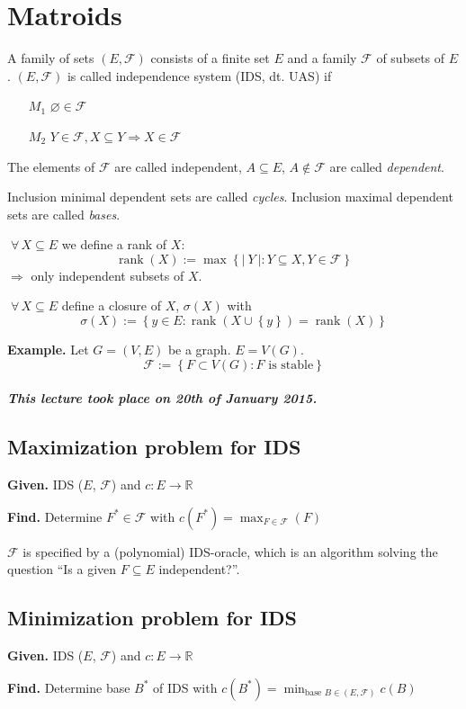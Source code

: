 \documentclass{article}
\newcommand{\card}[1]{\left|\:\!#1\:\!\right|}
\newcommand{\set}[1]{\left\{#1\right\}}
\newcommand{\given}[1]{\textbf{Given.} #1\par}
\newcommand{\find}[1]{\textbf{Find.} #1\par}
\newcommand{\dateref}[1]{\paragraph{\textit{This lecture took place on #1.}}}
\newcommand{\fall}{\;\forall\,}
\DeclareMathOperator{\rank}{rank}
\begin{document}
\section{Matroids}
%
A family of sets $(E, \mathcal{F})$ consists of a finite set $E$ and a family $\mathcal{F}$ of subsets of $E$.
$(E, \mathcal{F})$ is called independence system (IDS, dt. UAS) if
\begin{itemize}
  \item[$M_1$] $\diameter \in \mathcal{F}$
  \item[$M_2$] $Y \in \mathcal{F}, X \subseteq Y \Rightarrow X \in \mathcal{F}$
\end{itemize}

The elements of $\mathcal{F}$ are called independent, $A \subseteq E$, $A \notin \mathcal{F}$ are called \emph{dependent}.

Inclusion minimal dependent sets are called \emph{cycles}.
Inclusion maximal dependent sets are called \emph{bases}.

$\fall X \subseteq E$ we define a rank of $X$:
\[ \rank(X) := \max\set{\card{Y}: Y \subseteq X, Y \in \mathcal{F}} \]
$\Rightarrow$ only independent subsets of $X$.

$\fall X \subseteq E$ define a closure of $X$, $\sigma(X)$ with
\[ \sigma(X) := \set{y \in E: \rank(X \cup \set{y}) = \rank(X)} \]

\textbf{Example.}
  Let $G = (V, E)$ be a graph. $E = V(G)$.
  \[ \mathcal{F} := \set{F \subset V(G): F \text{ is stable}} \]

\dateref{20th of January 2015}

\subsection{Maximization problem for IDS}
%
\given{IDS ($E$, $\mathcal{F}$) and $c: E \rightarrow \mathbb{R}$}
\find{Determine $F^* \in \mathcal{F}$ with $c(F^*) = \max_{F \in \mathcal{F}}(F)$}

$\mathcal{F}$ is specified by a (polynomial) IDS-oracle, which is an algorithm solving the question ``Is a given $F \subseteq E$ independent?''.

\subsection{Minimization problem for IDS}
%
\given{IDS ($E$, $\mathcal{F}$) and $c: E \rightarrow \mathbb{R}$}
\find{Determine base $B^*$ of IDS with $c(B^*) = \min_{\text{base } B \in (E, \mathcal{F})} c(B)$}
\end{document}
